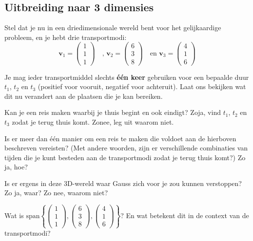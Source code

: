 \documentclass{ximera}
\begin{document}
\subsection*{Uitbreiding naar 3 dimensies}
Stel dat je nu in een driedimensionale wereld bent voor het gelijkaardige probleem, en je hebt drie transportmodi:
\[\mathbf{v}_1 = \begin{pmatrix} 1 \\ 1 \\ 1 \end{pmatrix}\quad \text{, }\mathbf{v}_2 = \begin{pmatrix} 6 \\ 3 \\ 8 \end{pmatrix}\quad \text{en }\mathbf{v}_3 = \begin{pmatrix} 4 \\ 1 \\ 6 \end{pmatrix}\]

Je mag ieder transportmiddel slechts \textbf{één keer} gebruiken voor een bepaalde duur \(t_1\), \(t_2\) en \(t_3\) (positief voor vooruit, negatief voor achteruit).
Laat ons bekijken wat dit nu verandert aan de plaatsen die je kan bereiken.

\begin{exercise}
Kan je een reis maken waarbij je thuis begint en ook eindigt?
Zoja, vind \(t_1\), \(t_2\) en \(t_3\) zodat je terug thuis komt.
Zonee, leg uit waarom niet.

\begin{question}
Is er meer dan één manier om een reis te maken die voldoet aan de hierboven beschreven vereisten?
(Met andere woorden, zijn er verschillende combinaties van tijden die je kunt besteden aan de transportmodi zodat je terug thuis komt?)
Zo ja, hoe?
\end{question}

\begin{question}
Is er ergens in deze 3D-wereld waar Gauss zich voor je zou kunnen verstoppen?
Zo ja, waar?
Zo nee, waarom niet?
\end{question}

\begin{question}
Wat is \(\text{span}\left\{\begin{pmatrix} 1 \\ 1 \\ 1 \end{pmatrix}, \begin{pmatrix} 6 \\ 3 \\ 8 \end{pmatrix}, \begin{pmatrix} 4 \\ 1 \\ 6 \end{pmatrix}\right\}\)?
En wat betekent dit in de context van de transportmodi?
\end{question}
\end{exercise}
\end{document}
